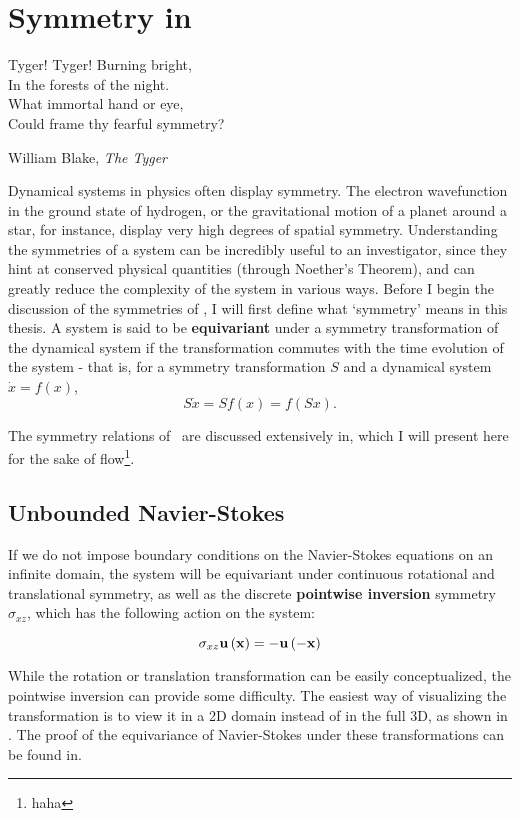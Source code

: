 \chapter{Symmetry in \pCf}	
\epigraph{Tyger! Tyger! Burning bright, \\
		In the forests of the night. \\
		What immortal hand or eye,\\
		Could frame thy fearful symmetry?}{William Blake, \emph{The Tyger}} 
Dynamical systems in physics often display symmetry. The electron wavefunction in the ground state of hydrogen, or the gravitational motion of a planet around a star, for instance, display very high degrees of spatial symmetry.  Understanding the symmetries of a system can be incredibly useful to an investigator, since they hint at conserved physical quantities (through Noether's Theorem), and can greatly reduce the complexity of the system in various ways. Before I begin the discussion of the symmetries of \pCf, I will first define what `symmetry' means in this thesis. A system is said to be {\bf equivariant} under a symmetry transformation of the dynamical system if the transformation commutes with the time evolution of the system - that is, for a symmetry transformation $S$ and a dynamical system $\dot{x} = f(x)$, 
\begin{equation}
S \dot{x} = Sf(x) = f(Sx).
\end{equation}

The symmetry relations of \pCf\ are discussed extensively in, which I will present here for the sake of flow\footnote{haha}. 
\section{Unbounded Navier-Stokes}

If we do not impose boundary conditions on the Navier-Stokes equations on an infinite domain, the system will be equivariant under continuous rotational and translational symmetry, as well as the discrete {\bf pointwise inversion} symmetry$\sigma_{xz}$, which has the following action on the system:

\begin{equation}\label{eq:pointwiseinversion}
\sigma_{xz}\mathbf{u}\left ( \mathbf{x} \right ) = -\mathbf{u}\left ( -\mathbf{x} \right )
\end{equation}

While the rotation or translation transformation can be easily conceptualized, the pointwise inversion can provide some difficulty. The easiest way of visualizing the transformation is to view it in a 2D domain instead of in the full 3D, as shown in . The proof of the equivariance of Navier-Stokes under these transformations can be found in.

